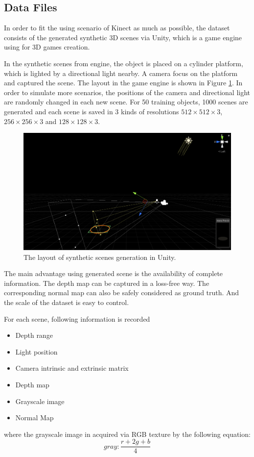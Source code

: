 \subsection{Data Files}
In order to fit the using scenario of Kinect as much as possible, the dataset consists of the generated synthetic 3D scenes via Unity, which is a game engine using for 3D games creation. 

In the synthetic scenes from engine, the object is placed on a cylinder platform, which is lighted by a directional light nearby. A camera focus on the platform and captured the scene. The layout in the game engine is shown in Figure \ref{fig:unity-workplace}. In order to simulate more scenarios, the positions of the camera and directional light are randomly changed in each new scene. For 50 training objects, 1000 scenes are generated and each scene is saved in 3 kinds of resolutions $ 512\times512\times3 $, $ 256\times256\times3 $ and $ 128\times128\times3 $.

\begin{figure}[h!]
	\centering
	\includegraphics[width=.8\textwidth]{./Figures/unity-workplace.PNG}
	\caption{The layout of synthetic scenes generation in Unity.}
	\label{fig:unity-workplace}
\end{figure}

The main advantage using generated scene is the availability of complete information. The depth map can be captured in a loss-free way. The corresponding normal map can also be safely considered as ground truth. And the scale of the dataset is easy to control.

For each scene, following information is recorded
\begin{itemize}
	\item Depth range
	\item Light position
	\item Camera intrinsic and extrinsic matrix
	\item Depth map
	\item Grayscale image
	\item Normal Map	
\end{itemize}
where the grayscale image in acquired via RGB texture by the following equation:
\[ gray: \frac{r+2g+b}{4}  \]





